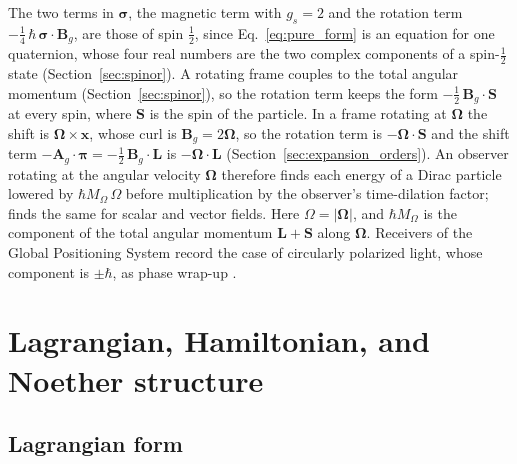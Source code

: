 \documentclass[aps,prd,onecolumn,tightenlines,nofootinbib,notitlepage,11pt,floatfix]{revtex4-2}
\theoremstyle{indentedtheorem}
\begin{document}
The two terms in $\boldsymbol{\sigma}$, the magnetic term with $g_s=2$ and the rotation term $-\tfrac{1}{4}\,\hbar\,\boldsymbol{\sigma}\cdot\mathbf{B}_g$, are those of spin $\tfrac{1}{2}$, since Eq.~\eqref{eq:pure_form} is an equation for one quaternion, whose four real numbers are the two complex components of a spin-$\tfrac{1}{2}$ state (Section~\ref{sec:spinor}). A rotating frame couples to the total angular momentum (Section~\ref{sec:spinor}), so the rotation term keeps the form $-\tfrac{1}{2}\,\mathbf{B}_g\cdot\mathbf{S}$ at every spin, where $\mathbf{S}$ is the spin of the particle. In a frame rotating at $\boldsymbol{\Omega}$ the shift is $\boldsymbol{\Omega}\times\mathbf{x}$, whose curl is $\mathbf{B}_g=2\boldsymbol{\Omega}$, so the rotation term is $-\boldsymbol{\Omega}\cdot\mathbf{S}$ and the shift term $-\mathbf{A}_g\cdot\boldsymbol{\pi}=-\tfrac{1}{2}\,\mathbf{B}_g\cdot\mathbf{L}$ is $-\boldsymbol{\Omega}\cdot\mathbf{L}$ (Section~\ref{sec:expansion_orders}). An observer rotating at the angular velocity $\boldsymbol{\Omega}$ therefore finds each energy of a Dirac particle lowered by $\hbar M_\Omega\,\Omega$ before multiplication by the observer's time-dilation factor; \citet{Mashhoon1998Helicity} finds the same for scalar and vector fields. Here $\Omega=|\boldsymbol{\Omega}|$, and $\hbar M_\Omega$ is the component of the total angular momentum $\mathbf{L}+\mathbf{S}$ along $\boldsymbol{\Omega}$. Receivers of the Global Positioning System record the case of circularly polarized light, whose component is $\pm\hbar$, as phase wrap-up \citep{Ashby2003Relativity}.

\section{Lagrangian, Hamiltonian, and Noether structure}
\label{sec:canonical}

\subsection{Lagrangian form}
\label{sec:lagrangian}
\end{document}
